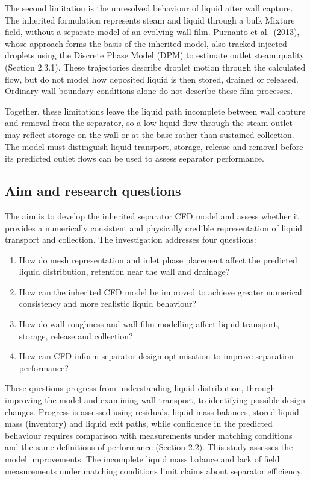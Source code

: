 \documentclass[12pt]{article}
\begin{document}
The second limitation is the unresolved behaviour of liquid after wall capture. The inherited formulation represents steam and liquid through a bulk Mixture field, without a separate model of an evolving wall film. Purnanto et al.~(2013), whose approach forms the basis of the inherited model, also tracked injected droplets using the Discrete Phase Model (DPM) to estimate outlet steam quality (Section 2.3.1). These trajectories describe droplet motion through the calculated flow, but do not model how deposited liquid is then stored, drained or released. Ordinary wall boundary conditions alone do not describe these film processes.

Together, these limitations leave the liquid path incomplete between wall capture and removal from the separator, so a low liquid flow through the steam outlet may reflect storage on the wall or at the base rather than sustained collection. The model must distinguish liquid transport, storage, release and removal before its predicted outlet flows can be used to assess separator performance.

\subsection{Aim and research questions}\label{aim-and-research-questions}

The aim is to develop the inherited separator CFD model and assess whether it provides a numerically consistent and physically credible representation of liquid transport and collection. The investigation addresses four questions:

\begin{enumerate}
\def\labelenumi{\arabic{enumi}.}
\item
  How do mesh representation and inlet phase placement affect the predicted liquid distribution, retention near the wall and drainage?
\item
  How can the inherited CFD model be improved to achieve greater numerical consistency and more realistic liquid behaviour?
\item
  How do wall roughness and wall-film modelling affect liquid transport, storage, release and collection?
\item
  How can CFD inform separator design optimisation to improve separation performance?
\end{enumerate}

These questions progress from understanding liquid distribution, through improving the model and examining wall transport, to identifying possible design changes. Progress is assessed using residuals, liquid mass balances, stored liquid mass (inventory) and liquid exit paths, while confidence in the predicted behaviour requires comparison with measurements under matching conditions and the same definitions of performance (Section 2.2). This study assesses the model improvements. The incomplete liquid mass balance and lack of field measurements under matching conditions limit claims about separator efficiency.
\end{document}
